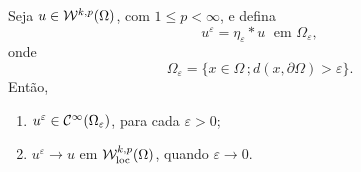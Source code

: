 \begin{tbox} \label{thm:aprox1}
    Seja $u \in \mathcal{W}^{k,p}(\Omega)$, com $1 \leqslant p < \infty$, e defina
    \[
        u^{\varepsilon} = \eta_{\varepsilon} * u \;\text{ em } \Omega_\varepsilon,
    \]
    onde
    \[
        \Omega_\varepsilon = \{ x \in \Omega \,; d(x,\partial\Omega) > \varepsilon\}.
    \]
    Então,
    \begin{enumerate}[leftmargin=*, label=\textbf{(\alph*)}]
        \item $u^\varepsilon \in \mathcal{C}^{\infty}(\Omega_\varepsilon)$, para cada $\varepsilon > 0$;
        \item $u^\varepsilon \to u$ em $\mathcal{W}^{k,p}_{\mathrm{loc}}(\Omega)$, quando $\varepsilon \to 0$.
    \end{enumerate}
\end{tbox}
